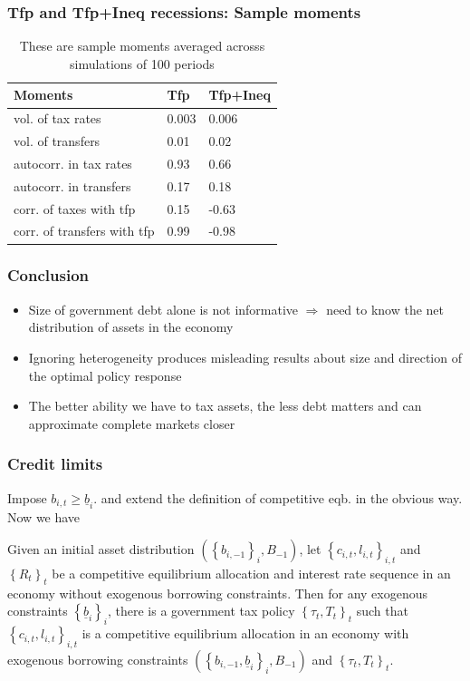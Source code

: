 \documentclass{beamer}
\begin{document}
\begin{frame}
\frametitle{Tfp and Tfp+Ineq recessions: Sample moments}
\begin{table}[htp]
\small
\begin{tabular}{|l|l|l|}
\hline
Moments &Tfp& Tfp+Ineq\\\hline
vol. of tax rates & 0.003&0.006\\
vol. of transfers &0.01 &0.02\\
autocorr. in tax rates& 0.93&0.66\\
autocorr. in transfers& 0.17&0.18\\
corr. of taxes with tfp &0.15 &-0.63\\
corr. of transfers with tfp & 0.99&-0.98\\ \hline
\end{tabular}
\caption{These are sample moments averaged acrosss simulations of 100 periods}
\label{tab:corr}
\end{table}

\end{frame}



\begin{frame}
\frametitle{Conclusion}

\begin{itemize}
\item Size of government debt alone is not informative $\Longrightarrow $
need to know the net distribution of assets in the economy

\item Ignoring heterogeneity produces misleading results about size and
direction of the optimal policy response

\item The better ability we have to tax assets, the less debt matters and
can approximate complete markets closer
\end{itemize}


\end{frame}

\begin{frame}\label{credit limits}
\frametitle{Credit limits}
Impose $b_{i,t}\geq \underline{b}_i.$ and extend the definition of competitive eqb. in the obvious way. Now we have

\begin{theorem}
\label{thm:borrowing_constraint}  Given an initial asset distribution $\left(
\left\{ b_{i,-1}\right\} _{i},B_{-1}\right)$, let $\left\{ c_{i,t},l_{i,t}\right\} _{i,t}$ and $\left\{ R_{t}\right\}_t $ be a competitive
equilibrium allocation and interest rate sequence in an economy without
exogenous borrowing constraints. Then for any exogenous
constraints $\left\{ \underline{b}_{i}\right\} _{i}$, there is a government
tax policy $\left\{ \tau _{t},T_{t}\right\} _{t}$ such that $\left\{
c_{i,t},l_{i,t}\right\} _{i,t}$ is a competitive equilibrium
allocation in an economy with exogenous borrowing constraints $\left(
\left\{ b_{i,-1},\underline{b}_{i}\right\} _{i},B_{-1}\right) $ and $\left\{
\tau _{t},T_{t}\right\} _{t}.$
\end{theorem}
\hyperlink{ricardian eqv}{}

\end{frame}
\end{document}
